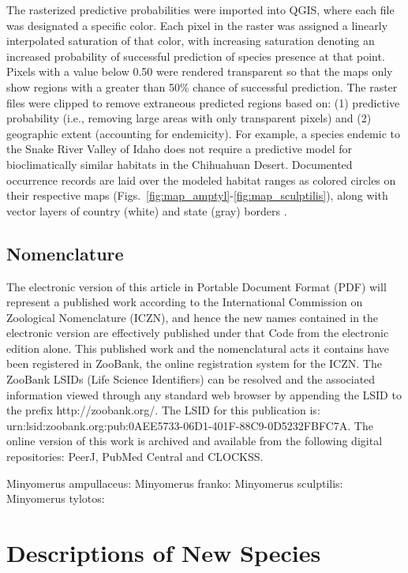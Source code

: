 \documentclass[fleqn,10pt,lineno]{wlpeerj} %
\begin{document}
		The rasterized predictive probabilities were imported into QGIS, where each file was designated a specific color. 
		Each pixel in the raster was assigned a linearly interpolated saturation of that color, with increasing saturation denoting an increased probability of successful prediction of species presence at that point.
		Pixels with a value below 0.50 were rendered transparent so that the maps only show regions with a greater than 50\% chance of successful prediction.
		The raster files were clipped to remove extraneous predicted regions based on: (1) predictive probability (i.e., removing large areas with only transparent pixels) and (2) geographic extent (accounting for endemicity).
		For example, a species endemic to the Snake River Valley of Idaho does not require a predictive model for bioclimatically similar habitats in the Chihuahuan Desert.
		Documented occurrence records are laid over the modeled habitat ranges as colored circles on their respective maps (Figs.~\ref{fig:map_amptyl}-\ref{fig:map_sculptilis}), along with vector layers of country (white) and state (gray) borders \citep{hijmans2012}.
		
	\subsection*{Nomenclature}
		The electronic version of this article in Portable Document Format (PDF) will represent a published work according to the International Commission on Zoological Nomenclature (ICZN), and hence the new names contained in the electronic version are effectively published under that Code from the electronic edition alone. 
		This published work and the nomenclatural acts it contains have been registered in ZooBank, the online registration system for the ICZN. 
		The ZooBank LSIDs (Life Science Identifiers) can be resolved and the associated information viewed through any standard web browser by appending the LSID to the prefix http://zoobank.org/. 
		The LSID for this publication is: urn:lsid:zoobank.org:pub:0AEE5733-06D1-401F-88C9-0D5232FBFC7A. The online version of this work is archived and available from the following digital repositories: PeerJ, PubMed Central and CLOCKSS.
		
Minyomerus ampullaceus: 
Minyomerus franko: 
Minyomerus sculptilis: 
Minyomerus tylotos: 
		
\section*{Descriptions of New Species}\label{sec:nsp} 
\end{document}
